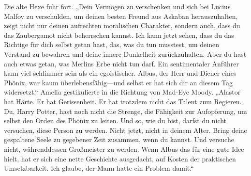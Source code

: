 Die alte Hexe fuhr fort.
„Dein Vermögen zu verschenken und sich bei Lucius Malfoy zu verschulden, um deinen besten Freund aus Askaban herauszuhalten, zeigt nicht nur deinen aufrechten moralischen Charakter, sondern auch, dass du das Zaubergamot nicht beherrschen kannst. Ich kann jetzt sehen, dass du das Richtige für dich selbst getan hast, das, was du tun musstest, um deinen Verstand zu bewahren und deine innere Dunkelheit zurückzuhalten. Aber du hast auch etwas getan, was Merlins Erbe nicht tun darf. Ein sentimentaler Anführer kann viel schlimmer sein als ein egoistischer. Albus, der Herr und Diener eines Phönix, war kaum überlebensfähig—und selbst er hat sich dir an diesem Tag widersetzt.“
Amelia gestikulierte in die Richtung von Mad-Eye Moody.
„Alastor hat Härte. Er hat Gerissenheit. Er hat trotzdem nicht das Talent zum Regieren. Du, Harry Potter, hast noch nicht die Strenge, die Fähigkeit zur Aufopferung, um selbst den Orden des Phönix zu leiten. Und so, wie du bist, darfst du nicht versuchen, diese Person zu werden. Nicht jetzt, nicht in deinem Alter. Bring deine gespaltene Seele zu gegebener Zeit zusammen, wenn du kannst. Und versuche nicht, währenddessen Großmeister zu werden. Wenn Albus das für eine gute Idee hielt, hat er sich eine nette Geschichte ausgedacht, auf Kosten der praktischen Umsetzbarkeit. Ich glaube, der Mann hatte ein Problem damit.“

